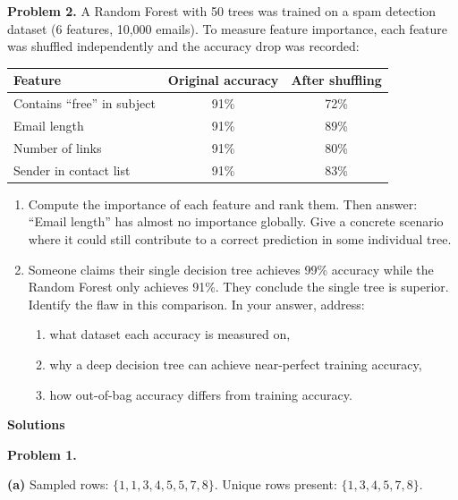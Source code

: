 \documentclass[11pt,a4paper]{article}
\begin{document}
\bigskip

\textbf{Problem 2.}
A Random Forest with 50 trees was trained on a spam detection dataset (6 features, 10{,}000 emails). To measure feature importance, each feature was shuffled independently and the accuracy drop was recorded:

\begin{center}
\begin{tabular}{l|cc}
Feature & Original accuracy & After shuffling \\
\hline
Contains ``free'' in subject  & 91\% & 72\% \\
Email length                  & 91\% & 89\% \\
Number of links               & 91\% & 80\% \\
Sender in contact list        & 91\% & 83\% \\
\end{tabular}
\end{center}

\begin{enumerate}[label=(\alph*)]
\item Compute the importance of each feature and rank them. Then answer: ``Email length'' has almost no importance globally. Give a concrete scenario where it could still contribute to a correct prediction in some individual tree.

\item Someone claims their single decision tree achieves 99\% accuracy while the Random Forest only achieves 91\%. They conclude the single tree is superior. Identify the flaw in this comparison. In your answer, address:
\begin{enumerate}[label=(\roman*)]
  \item what dataset each accuracy is measured on,
  \item why a deep decision tree can achieve near-perfect training accuracy,
  \item how out-of-bag accuracy differs from training accuracy.
\end{enumerate}
\end{enumerate}

\newpage

\begin{center}
{\Large\bfseries Solutions}
\end{center}

\bigskip

\textbf{Problem 1.}

\textbf{(a)} Sampled rows: $\{1, 1, 3, 4, 5, 5, 7, 8\}$. Unique rows present: $\{1, 3, 4, 5, 7, 8\}$.
\end{document}
